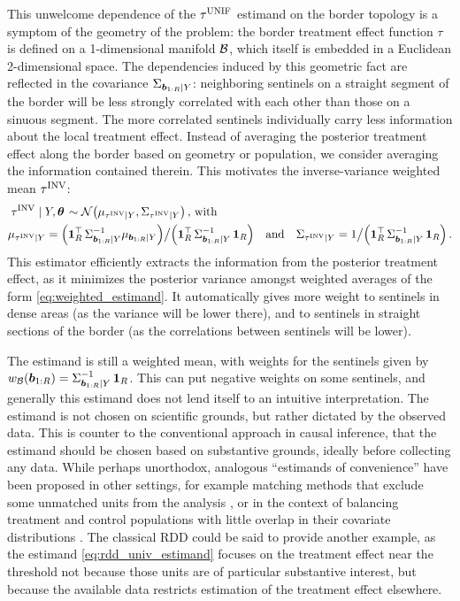 \documentclass[12pt]{article}
\begin{document}
This unwelcome dependence of the \(\tau^{\mathrm{UNIF}}\) estimand on the border topology is a symptom of the geometry of the problem: the border treatment effect function \(\tau\) is defined on a 1-dimensional manifold $\mathcal{B}$, which itself is embedded in a Euclidean 2-dimensional space.
The dependencies induced by this geometric fact are reflected in the covariance \(\Sigma_{\bm{b}_{1:R} \mid Y}\): neighboring sentinels on a straight segment of the border will be less strongly correlated with each other than those on a sinuous segment.
The more correlated sentinels individually carry less information about the local treatment effect.
Instead of averaging the posterior treatment effect along the border based on geometry or population, we consider averaging the information contained therein.
This motivates the inverse-variance weighted mean \(\tau^{\mathrm{INV}}\):
\begin{equation}
    \begin{split}
        & \left. \invvar \mid Y, \hyperparam \right. \sim \normal\del{\mu_{\invvar \mid Y}, \Sigma_{\invvar \mid Y}} \,\text{, with} \\
        & \mu_{\invvar \mid Y} = \del{\ones_{\numsent}\trans \Sigma_{\sentinels \mid Y}^{-1} \mu_{\sentinels \mid Y}} \big/ \del{\ones_{\numsent}\trans \Sigma_{\sentinels \mid Y}^{-1} \ones_{\numsent}} \quad\text{and}\quad
        \Sigma_{\invvar \mid Y} = 1 \big/ \del{\ones_{\numsent}\trans \Sigma_{\sentinels \mid Y}^{-1} \ones_{\numsent}} \,.
    \end{split}
    \label{eq:invvar}
\end{equation}
This estimator efficiently extracts the information from the posterior treatment effect, as it minimizes the posterior variance amongst weighted averages of the form \autoref{eq:weighted_estimand}.
It automatically gives more weight to sentinels in dense areas (as the variance will be lower there), and to sentinels in straight sections of the border (as the correlations between sentinels will be lower).

The estimand is still a weighted mean, with weights for the sentinels given by \(w_{\mathcal{B}}(\bm{b}_{1:R}) = \Sigma_{\bm{b}_{1:R} \mid Y}^{-1} \operatorname{\mathbf{1}}_{R}\).
This can put negative weights on some sentinels, and generally this estimand does not lend itself to an intuitive interpretation.
The estimand is not chosen on scientific grounds, but rather dictated by the observed data.
This is counter to the conventional approach in causal inference, that the estimand should be chosen based on substantive grounds, ideally before collecting any data.
While perhaps unorthodox, analogous ``estimands of convenience'' have been proposed in other settings, for example matching methods that exclude some unmatched units from the analysis \citep[discussed in][]{crump2009dealing}, or in the context of balancing treatment and control populations with little overlap in their covariate distributions \citep{li2016balancing}.
The classical RDD could be said to provide another example, as the estimand \autoref{eq:rdd_univ_estimand} focuses on the treatment effect near the threshold not because those units are of particular substantive interest, but because the available data restricts estimation of the treatment effect elsewhere.
\end{document}
